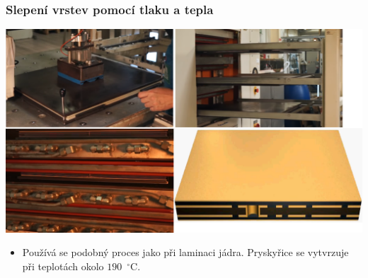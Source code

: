 \documentclass{beamer}
\begin{document}
\begin{frame}
	\frametitle{Slepení vrstev pomocí tlaku a tepla}

	\begin{center}
		\includegraphics[scale=0.15]{vnejsiCuFilm.png}
	\end{center}
	
	\begin{itemize}
		\item Používá se podobný proces jako při laminaci jádra. Pryskyřice se vytvrzuje při teplotách okolo $190$~$^\circ$C.
	\end{itemize}
\end{frame}
\end{document}
